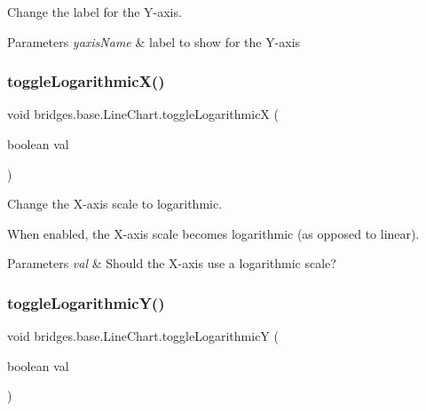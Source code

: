 Change the label for the Y-\/axis. 


\begin{DoxyParams}{Parameters}
{\em yaxis\+Name} & label to show for the Y-\/axis \\
\hline
\end{DoxyParams}
\mbox{\label{classbridges_1_1base_1_1_line_chart_ad3e5e54c382ac605a81b6b61c250ad16}} 
\subsubsection{\texorpdfstring{toggleLogarithmicX()}{toggleLogarithmicX()}}
{\footnotesize\ttfamily void bridges.\+base.\+Line\+Chart.\+toggle\+LogarithmicX (\begin{DoxyParamCaption}\item[{boolean}]{val }\end{DoxyParamCaption})}



Change the X-\/axis scale to logarithmic. 

When enabled, the X-\/axis scale becomes logarithmic (as opposed to linear).


\begin{DoxyParams}{Parameters}
{\em val} & Should the X-\/axis use a logarithmic scale? \\
\hline
\end{DoxyParams}
\mbox{\label{classbridges_1_1base_1_1_line_chart_a7946f217a7b3567ee1a1bd8266ed43ca}} 
\subsubsection{\texorpdfstring{toggleLogarithmicY()}{toggleLogarithmicY()}}
{\footnotesize\ttfamily void bridges.\+base.\+Line\+Chart.\+toggle\+LogarithmicY (\begin{DoxyParamCaption}\item[{boolean}]{val }\end{DoxyParamCaption})}



